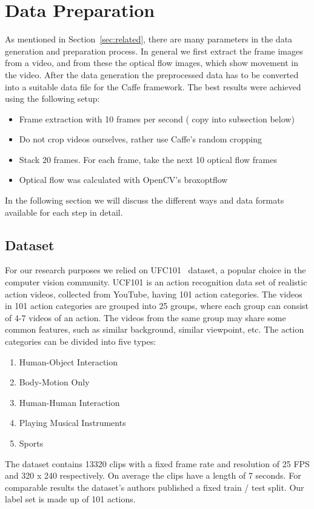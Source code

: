 \section{Data Preparation}
\label{sec:data}

As mentioned in Section~\ref{sec:related}, there are many parameters in the data generation and preparation process.
In general we first extract the frame images from a video, and from these the optical flow images, which show movement in the video.
After the data generation the preprocessed data has to be converted into a suitable data file for the Caffe framework.
The best results were achieved using the following setup:
\begin{itemize}
	\item Frame extraction with 10 frames per second ( copy into subsection below)
	\item Do not crop videos ourselves, rather use Caffe's random cropping
	\item Stack 20 frames. For each frame, take the next 10 optical flow frames
	\item Optical flow was calculated with OpenCV's broxoptflow~\cite{brox2004high}
\end{itemize}
In the following section we will discuss the different ways and data formats available for each step in detail.

\subsection{Dataset}
For our research purposes we relied on UFC101~\cite{soomro2012ucf101} dataset, a popular choice in the computer vision community.
UCF101 is an action recognition data set of realistic action videos, collected from YouTube, having 101 action categories.
The videos in 101 action categories are grouped into 25 groups, where each group can consist of 4-7 videos of an action.
The videos from the same group may share some common features, such as similar background, similar viewpoint, etc.
The action categories can be divided into five types:
\begin{enumerate}
\item Human-Object Interaction
\item Body-Motion Only
\item Human-Human Interaction
\item Playing Musical Instruments
\item Sports
\end{enumerate}
The dataset contains 13320 clips with a fixed frame rate and resolution of 25 FPS and 320 x 240 respectively.
On average the clips have a length of 7 seconds. For comparable results the dataset's authors published a fixed train / test split.
Our label set is made up of 101 actions.

